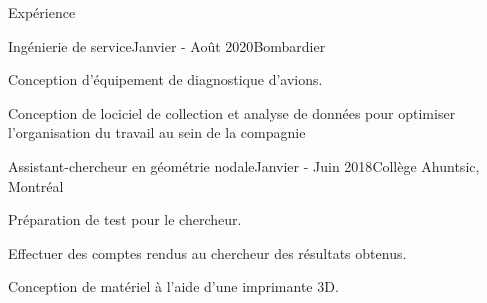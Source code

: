 \documentclass{resume} %
\begin{document}
	
	
	\begin{rSection}{Expérience}
		
		\begin{rSubsection}{Ingénierie de service}{Janvier - Août 2020}{Bombardier}{}{}
			\item Conception d'équipement de diagnostique d'avions.
			\item Conception de lociciel de collection et analyse de données pour optimiser l'organisation du travail au sein de la compagnie
		\end{rSubsection}
		
		\begin{rSubsection}{Assistant-chercheur en géométrie nodale}{Janvier - Juin 2018}{Collège Ahuntsic, Montréal}{}
			\item   Préparation de test pour le chercheur.
			\item   Effectuer des comptes rendus au chercheur des résultats obtenus.
			\item   Conception de matériel à l’aide d’une imprimante 3D.
		\end{rSubsection}
		
		
	\end{rSection}
	
	
\end{document}
